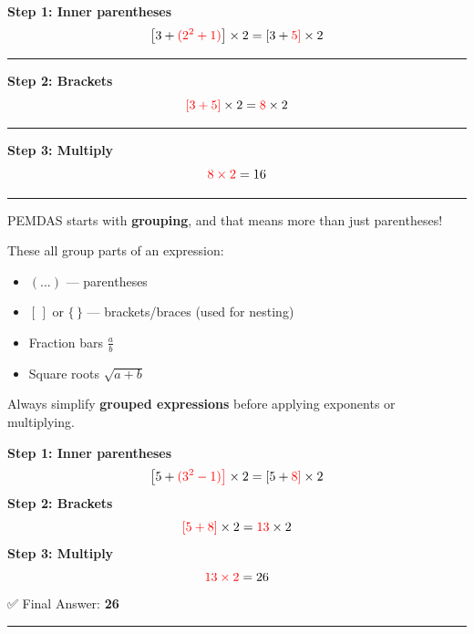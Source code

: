 \documentclass[
  letterpaper,
  DIV=11,
  numbers=noendperiod]{scrreprt}
\providecommand{\tightlist}{%
  \setlength{\itemsep}{0pt}\setlength{\parskip}{0pt}}
\begin{document}
\textbf{Step 1: Inner parentheses}\\
\[
\left[ 3 + \color{red}{(2^2 + 1)} \color{black}\right] \times 2 = \left[ 3 + \color{red}{5} \right] \times 2
\]

\begin{center}\rule{0.5\linewidth}{0.5pt}\end{center}

\textbf{Step 2: Brackets}\\
\[
\color{red}{\left[ 3 + 5 \right]} \color{black} \times 2 = \color{red}{8} \color{black} \times 2
\]

\begin{center}\rule{0.5\linewidth}{0.5pt}\end{center}

\textbf{Step 3: Multiply}\\
\[
\color{red}{8 \times 2} \color{black} = 16
\]

\begin{center}\rule{0.5\linewidth}{0.5pt}\end{center}

PEMDAS starts with \textbf{grouping}, and that means more than just
parentheses!

These all group parts of an expression:

\begin{itemize}
\tightlist
\item
  \((...)\) --- parentheses
\item
  \([\,]\) or \(\{\,\}\) --- brackets/braces (used for nesting)
\item
  Fraction bars \(\frac{a}{b}\)
\item
  Square roots \(\sqrt{a + b}\)
\end{itemize}

Always simplify \textbf{grouped expressions} before applying exponents
or multiplying.

\textbf{Step 1: Inner parentheses}\\
\[
\left[ 5 + \color{red}{(3^2 - 1)} \right] \times 2 = \left[ 5 + \color{red}{8} \right] \times 2
\] \textbf{Step 2: Brackets}\\
\[
\color{red}{\left[ 5 + 8 \right]} \color{black} \times 2 = \color{red}{13} \color{black} \times 2
\] \textbf{Step 3: Multiply}\\
\[
\color{red}{13 \times 2} \color{black} = 26
\] ✅ Final Answer: \textbf{26}

\begin{center}\rule{0.5\linewidth}{0.5pt}\end{center}
\end{document}

